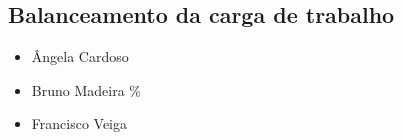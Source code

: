 
\subsection{Balanceamento da carga de trabalho}
\begin{itemize}
\item \^Angela Cardoso    %
\item Bruno Madeira \%  %
\item Francisco Veiga				%
\end{itemize}